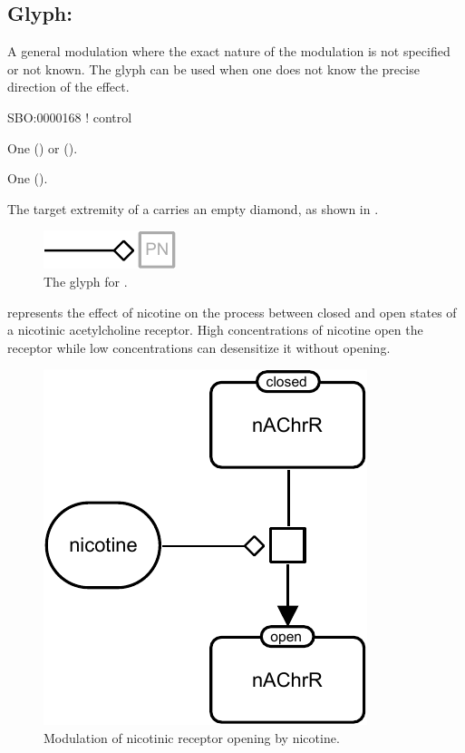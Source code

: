 \subsection{Glyph: }
\label{sec:modulation}


A general modulation where the exact nature of the modulation is not specified or not known.
The  glyph can be used when one does not know the precise direction of the effect.

\begin{glyphDescription}

\glyphSboTerm
SBO:0000168 ! control

\glyphOrigin
One  () or   ().

\glyphTarget
One  ().

\glyphSymbol
The target extremity of a  carries an empty diamond, as shown in .

\end{glyphDescription}

\begin{figure}[H]
  \centering
  \includegraphics{images/modulation}
  \caption{The \PD glyph for .}
  \label{fig:modulation}
\end{figure}

 represents the effect of nicotine on the process between closed and open states of a nicotinic acetylcholine receptor. High concentrations of nicotine open the receptor while low concentrations can desensitize it without opening.

\begin{figure}[H]
  \centering
  \includegraphics[scale = 0.8]{examples/modulation-nAChR}
  \caption{Modulation of nicotinic receptor opening by nicotine.}
  \label{fig:modul-nico}
\end{figure}
